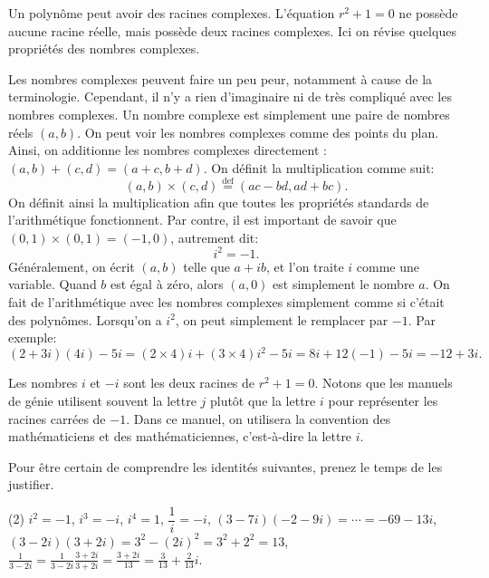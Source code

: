 Un polynôme peut avoir des racines complexes. L'équation  $r^2 + 1 = 0$ ne possède aucune racine réelle, mais possède deux racines complexes. 
Ici on révise quelques propriétés des nombres complexes.

Les nombres complexes peuvent faire un peu peur, notamment à cause de la terminologie. Cependant, il n'y a rien d'imaginaire ni de très compliqué avec les nombres complexes. 
Un nombre complexe est simplement une paire de nombres réels $(a,b)$.  
On peut voir les nombres complexes comme des points du plan. Ainsi, on additionne les nombres complexes directement :  $(a,b)+(c,d)=(a+c,b+d)$.  On définit la multiplication  comme suit: 
\begin{equation*}
(a,b) \times (c,d) \overset{\text{def}}{=} (ac-bd,ad+bc) .
\end{equation*}
On définit ainsi la multiplication afin que toutes les propriétés standards de l'arithmétique fonctionnent. Par contre, il est important de savoir que  $(0,1) \times (0,1) = (-1,0)$, autrement dit:
 \begin{equation*}
i^2=-1.
\end{equation*}
Généralement, on écrit  $(a,b)$ telle que $a+ib$, et l'on traite $i$ comme une variable.  Quand $b$ est égal à zéro, alors $(a,0)$ est simplement le nombre $a$.
On fait de l'arithmétique avec les nombres complexes simplement comme si c'était des polynômes. 
Lorsqu'on a $i^2$, on peut simplement le remplacer par  $-1$.
Par exemple: 
\begin{equation*}
(2+3i)(4i) - 5i = 
(2\times 4)i + (3 \times 4) i^2 - 5i
=
8i + 12 (-1) - 5i
=
-12 + 3i .
\end{equation*}

Les nombres
$i$ et $-i$ sont les deux racines de $r^2 + 1 = 0$.
Notons que les manuels de génie utilisent souvent la lettre $j$ plutôt que la lettre $i$ pour représenter les racines carrées de $-1$. Dans ce manuel, on utilisera la convention des mathématiciens et des mathématiciennes, c'est-à-dire la lettre  $i$.

\begin{exercise}
Pour être certain de comprendre les identités suivantes, prenez le temps de les justifier. 
\begin{tasks}(2)
\task $i^2 = -1$, $i^3 = -i$, $i^4 = 1$,
\task $\dfrac{1}{i} = -i$,
\task $(3-7i)(-2-9i) = \cdots = -69-13i$,
\task $(3-2i)(3+2i) = 3^2 - {(2i)}^2 = 3^2 + 2^2 = 13$,
\task $\frac{1}{3-2i} = \frac{1}{3-2i} \frac{3+2i}{3+2i} = \frac{3+2i}{13}
= \frac{3}{13}+\frac{2}{13}i$.
\end{tasks}
\end{exercise}

